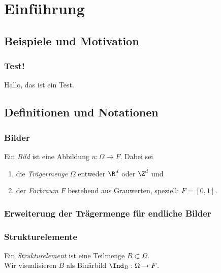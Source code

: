 \documentclass{beamer}
\begin{document}
\section{Einführung}

\subsection{Beispiele und Motivation}

\begin{frame}
    \frametitle{Test!}
    Hallo, das ist ein Test.
\end{frame}


\subsection{Definitionen und Notationen}

\begin{frame}
    \frametitle{Bilder}
    \begin{definition}
        Ein \emph{Bild} ist eine Abbildung $u: \Omega \to F$. \pause
        Dabei sei
        \begin{enumerate}[1.]
            \item
                die \emph{Trägermenge} $\Omega$ entweder $\R^d$ oder $\Z^d$ \pause und
            \item
                der \emph{Farbraum} $F$ bestehend aus Grauwerten, speziell: $F = [0,1]$.
        \end{enumerate}
    \end{definition}
\end{frame}

\begin{frame}
    \frametitle{Erweiterung der Trägermenge für endliche Bilder}
\end{frame}

\begin{frame}
    \frametitle{Strukturelemente}
    \begin{definition}
        Ein \emph{Strukturelement} ist eine Teilmenge $B \subset \Omega$. \\ \pause
        Wir visualisieren $B$ als Binärbild $\Ind_B: \Omega \to F$.
    \end{definition}
\end{frame}
\end{document}

